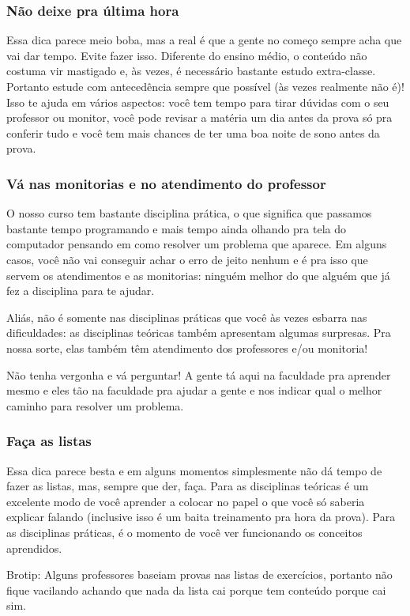 \subsubsection{Não deixe pra última hora}
Essa dica parece meio boba, mas a real é que a gente no começo sempre acha que vai dar tempo. Evite fazer isso. Diferente do ensino médio, o conteúdo não costuma vir mastigado e, às vezes, é necessário bastante estudo extra-classe. Portanto estude com antecedência sempre que possível (às vezes realmente não é)! Isso te ajuda em vários aspectos: você tem tempo para tirar dúvidas com o seu professor ou monitor, você pode revisar a matéria um dia antes da prova só pra conferir tudo e você tem mais chances de ter uma boa noite de sono antes da prova.

\subsubsection{Vá nas monitorias e no atendimento do professor}
O nosso curso tem bastante disciplina prática, o que significa que passamos bastante tempo programando e mais tempo ainda olhando pra tela do computador pensando em como resolver um problema que aparece. Em alguns casos, você não vai conseguir achar o erro de jeito nenhum e é pra isso que servem os atendimentos e as monitorias: ninguém melhor do que alguém que já fez a disciplina para te ajudar.

Aliás, não é somente nas disciplinas práticas que você às vezes esbarra nas dificuldades: as disciplinas teóricas também apresentam algumas surpresas. Pra nossa sorte, elas também têm atendimento dos professores e/ou monitoria!

Não tenha vergonha e vá perguntar! A gente tá aqui na faculdade pra aprender mesmo e eles tão na faculdade pra ajudar a gente e nos indicar qual o melhor caminho para resolver um problema.

\subsubsection{Faça as listas}
Essa dica parece besta e em alguns momentos simplesmente não dá tempo de fazer as listas, mas, sempre que der, faça. Para as disciplinas teóricas é um excelente modo de você aprender a colocar no papel o que você só saberia explicar falando (inclusive isso é um baita treinamento pra hora da prova). Para as disciplinas práticas, é o momento de você ver funcionando os conceitos aprendidos.

Brotip: Alguns professores baseiam provas nas listas de exercícios, portanto não fique vacilando achando que nada da lista cai porque tem conteúdo porque cai sim.

